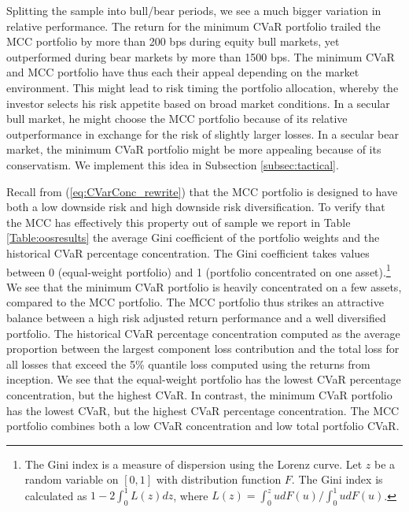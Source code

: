 \documentclass[12pt,a4paper]{article}
\begin{document}
Splitting the sample into bull/bear periods, we see a much bigger variation in relative performance. The return for the minimum CVaR portfolio trailed the MCC portfolio by more than 200 bps during equity bull markets, yet outperformed during bear markets by more than 1500 bps. The minimum CVaR and MCC portfolio have thus each their appeal depending on the market environment. This might lead to risk timing the portfolio allocation, whereby the investor selects his risk appetite based on broad market conditions. In a secular bull market, he might choose the MCC portfolio because of its relative outperformance in exchange for the risk of slightly larger losses. In a secular bear market, the minimum CVaR portfolio might be more appealing because of its conservatism. We implement this idea in Subsection \ref{subsec:tactical}.

Recall from (\ref{eq:CVarConc_rewrite}) that the MCC portfolio is designed to have both a low downside risk and high downside risk diversification. To verify that the MCC has effectively this property out of sample we report in Table  \ref{Table:oosresults} the average Gini coefficient of the portfolio weights and the historical CVaR percentage concentration. The Gini coefficient takes values between 0 (equal-weight portfolio) and 1 (portfolio concentrated on one asset).\footnote{The Gini index is a measure of dispersion using the Lorenz curve. Let $z$ be a random variable
on $[0,1]$ with distribution function $F$. The Gini index is calculated as $1-2\int_{0}^1 L(z)dz$, where $L(z)=\int_{0}^{z} udF(u)/\int_{0}^1 udF(u)$. } We see that the minimum CVaR portfolio is heavily concentrated on a few assets, compared to the MCC portfolio. The MCC portfolio thus strikes an attractive balance between a high risk adjusted return performance and a well diversified portfolio. The historical CVaR percentage concentration computed as the average proportion between the largest component loss contribution and the total loss for all losses that exceed the 5\% quantile loss computed using the returns from inception. We see that the equal-weight portfolio has the lowest CVaR percentage concentration, but the highest CVaR. In contrast, the minimum CVaR portfolio has the lowest CVaR, but the highest CVaR percentage concentration. The MCC portfolio combines both a low CVaR concentration and low total portfolio CVaR.
\end{document}
